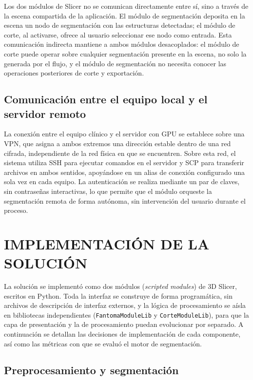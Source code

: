 Los dos módulos de Slicer no se comunican directamente entre sí, sino a través de la escena compartida de la aplicación. El módulo de segmentación deposita en la escena un nodo de segmentación con las estructuras detectadas; el módulo de corte, al activarse, ofrece al usuario seleccionar ese nodo como entrada. Esta comunicación indirecta mantiene a ambos módulos desacoplados: el módulo de corte puede operar sobre cualquier segmentación presente en la escena, no solo la generada por el flujo, y el módulo de segmentación no necesita conocer las operaciones posteriores de corte y exportación.\\

\subsection{Comunicación entre el equipo local y el servidor remoto}

La conexión entre el equipo clínico y el servidor con GPU se establece sobre una VPN, que asigna a ambos extremos una dirección estable dentro de una red cifrada, independiente de la red física en que se encuentren. Sobre esta red, el sistema utiliza SSH para ejecutar comandos en el servidor y SCP para transferir archivos en ambos sentidos, apoyándose en un alias de conexión configurado una sola vez en cada equipo. La autenticación se realiza mediante un par de claves, sin contraseñas interactivas, lo que permite que el módulo orqueste la segmentación remota de forma autónoma, sin intervención del usuario durante el proceso.\\

\section{IMPLEMENTACIÓN DE LA SOLUCIÓN}

La solución se implementó como dos módulos (\textit{scripted modules}) de 3D Slicer, escritos en Python. Toda la interfaz se construye de forma programática, sin archivos de descripción de interfaz externos, y la lógica de procesamiento se aísla en bibliotecas independientes (\texttt{FantomaModuleLib} y \texttt{CorteModuleLib}), para que la capa de presentación y la de procesamiento puedan evolucionar por separado. A continuación se detallan las decisiones de implementación de cada componente, así como las métricas con que se evaluó el motor de segmentación.\\

\subsection{Preprocesamiento y segmentación}

